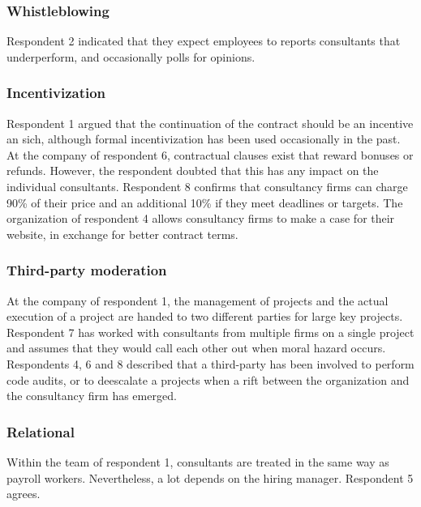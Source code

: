 \documentclass[12pt]{article}
\begin{document}
\subsubsection{Whistleblowing}\label{whistleblowing-1}

Respondent 2 indicated that they expect employees to reports consultants
that underperform, and occasionally polls for opinions.

\subsubsection{Incentivization}\label{incentivization-1}

Respondent 1 argued that the continuation of the contract should be an
incentive an sich, although formal incentivization has been used
occasionally in the past. At the company of respondent 6, contractual
clauses exist that reward bonuses or refunds. However, the respondent
doubted that this has any impact on the individual consultants.
Respondent 8 confirms that consultancy firms can charge 90\% of their
price and an additional 10\% if they meet deadlines or targets. The
organization of respondent 4 allows consultancy firms to make a case for
their website, in exchange for better contract terms.

\subsubsection{Third-party moderation}\label{third-party-moderation-1}

At the company of respondent 1, the management of projects and the
actual execution of a project are handed to two different parties for
large key projects. Respondent 7 has worked with consultants from
multiple firms on a single project and assumes that they would call each
other out when moral hazard occurs. Respondents 4, 6 and 8 described
that a third-party has been involved to perform code audits, or to
deescalate a projects when a rift between the organization and the
consultancy firm has emerged.

\subsubsection{Relational}\label{relational-1}

Within the team of respondent 1, consultants are treated in the same way
as payroll workers. Nevertheless, a lot depends on the hiring manager.
Respondent 5 agrees.
\end{document}
